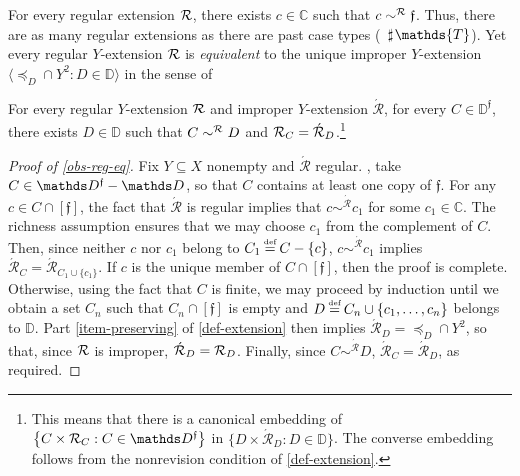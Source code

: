 \documentclass[12pt,a4paper,twoside]{article}
\newcommand{\novel}{\mathfrak f}
\newcommand{\preceqb}{\mathbin{\preceq}}
\newcommand{\countof}{\mathbin{\sharp}\hskip1pt}
\newcommand{\ext}{\mathrel{\mc R}}
\newcommand{\extb}{\mathbin{\mc R}}
\newcommand{\aext}{\mathrel{\acute{\mathrel{\mathcal R}}}}
\newcommand{\aextb}{\mathbin{\acute{\mathbin{\mathcal R}}}}
\newcommand{\mbbd}{{\mathds D}}
\newcommand{\mbbdp}{{\mathds D^{\novel}}}
\newcommand{\mbbc}{{\mathds C}}
\newcommand{\mbbt}{{\mathds {T}}}
\begin{document}
For every regular extension $\ext$, there exists $c \in \mbbc$ such that
$c \sim^{\extb} \novel$. Thus, there are as many regular extensions as there are
past case types (\ie\ $\countof \mbbt$).  Yet every regular $Y$-extension $\ext$
is \emph{equivalent} to the unique improper $Y$-extension
$ \langle \preceqb_{D} \cap Y^{2}: D \in \mbbd\rangle$ in the sense of 
\begin{observation}\label{obs-reg-eq}%
  For every regular $Y$-extension $\ext$ and improper $Y$-extension $\aext$, for
  every $ C \in \mbbdp $, there exists $ D \in \mbbd $ such that
  $C \sim^{\extb} D$ and $\extb_{C} = \aextb_{D}$.\footnote{This means that
    there is a canonical embedding of
    $\left\{C \times \extb_{C}: C \in \mbbdp\right\}$ in
    $\{D \times \aextb_{D}: D \in \mbbd\}$. The converse embedding follows from
    the nonrevision condition of \cref{def-extension}.} %
\end{observation}

\begin{proof}[Proof of \cref{obs-reg-eq}]\label{proof-reg-eq}
  Fix $Y\subseteq X$ nonempty and $\aext$ regular.  \Wlog, take $ C \in \mbbdp
  \bs \mbbd $, so that $ C $ contains at least one copy of $ \novel
  $.  For any $ c \in C \cap [ \novel ] $, the fact that $ \aext
  $ is regular implies that $ c \sim^{\aextb} c _ 1 $ for some $ c _ 1 \in \mbbc
  $.  The richness assumption ensures that we may choose $ c _ 1
  $ from the complement of $ C $.  Then, since neither $c$ nor
  $c_{1}$ belong to $ C _ 1 \defeq C \bs \{c\} $, $c \sim^{\aextb}
  c_{1}$ implies $ \aextb_{C} = \aextb _ { C _ 1 \cup \{c_{1}\} }$.  If $ c
  $ is the unique member of $ C \cap [ \novel
  ]$, then the proof is complete.  Otherwise, using the fact that $ C
  $ is finite, we may proceed by induction until we obtain a set $ C _ n
  $ such that $ C _ n \cap [\novel ] $ is empty and $ D \defeq C _ n \cup \{ c _
  1 , \dots , c _ n \} $ belongs to $ \mbbd
  $.  Part \ref{item-preserving} of \cref{def-extension} then implies $ \aextb _
  { D } = \preceqb _ { D } \cap Y^{2}$, so that, since
  $\ext$ is improper, $\aextb_{D}=\extb_{D}$.  Finally, since $C \sim ^{\aextb}
  D$, $ \aextb _ { C } = \aextb_{D} $, as required.
\end{proof}
\end{document}

